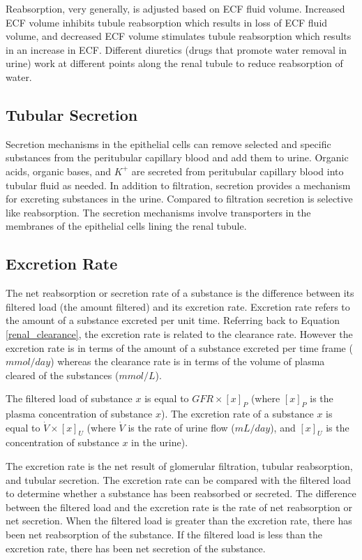 Reabsorption, very generally, is adjusted based on ECF fluid volume. Increased ECF volume inhibits tubule reabsorption which results in loss of ECF fluid volume, and decreased ECF volume stimulates tubule reabsorption which results in an increase in ECF. Different diuretics (drugs that promote water removal in urine) work at different points along the renal tubule to reduce reabsorption of water.


\subsection{Tubular Secretion}

Secretion mechanisms in the epithelial cells can remove selected and specific substances from the peritubular capillary blood and add them to urine. Organic acids, organic bases, and $K^+$ are secreted from peritubular capillary blood into tubular fluid as needed. In addition to filtration, secretion provides a mechanism for excreting substances in the urine. Compared to filtration secretion is selective like reabsorption. The secretion mechanisms involve transporters in the membranes of the epithelial cells lining the renal tubule.

\subsection{Excretion Rate}

The net reabsorption or secretion rate of a substance is the difference between its filtered load (the amount filtered) and its excretion rate. Excretion rate refers to the amount of a substance excreted per unit time. Referring back to Equation \ref{renal_clearance}, the excretion rate is related to the clearance rate. However the excretion rate is in terms of the amount of a substance excreted per time frame ($mmol/day$) whereas the clearance rate is in terms of the volume of plasma cleared of the substances ($mmol/L$). 

The filtered load of substance $x$ is equal to $GFR \times [x]_P$ (where $[x]_P$ is the plasma concentration of substance $x$). The excretion rate of a substance $x$ is equal to $\dot{V} \times [x]_U$ (where $\dot{V}$ is the rate of urine flow ($mL/day$), and $[x]_U$ is the concentration of substance $x$ in the urine). 

The excretion rate is the net result of glomerular filtration, tubular reabsorption, and tubular secretion. The excretion rate can be compared with the filtered load to determine whether a substance has been reabsorbed or secreted. The difference between the filtered load and the excretion rate is the rate of net reabsorption or net secretion. When the filtered load is greater than the excretion rate, there has been net reabsorption of the substance. If the filtered load is less than the excretion rate, there has been net secretion of the substance.

